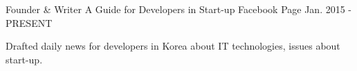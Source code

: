 

\begin{cventries}

  \cventry
    {Founder \& Writer} %
    {A Guide for Developers in Start-up} %
    {Facebook Page} %
    {Jan. 2015 - PRESENT} %
    {
      \begin{cvitems} %
        \item {Drafted daily news for developers in Korea about IT technologies, issues about start-up.}
      \end{cvitems}
    }

\end{cventries}
